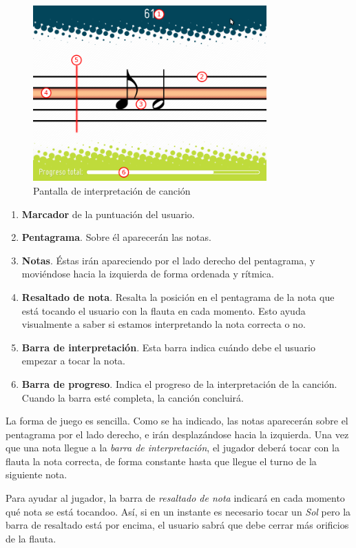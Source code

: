 \begin{figure}[h!]
  \centering
  \includegraphics[width=0.8\textwidth]{apendice_manual_usuario/imagen_seccionCanciones2}
  \caption{Pantalla de interpretación de canción}
\end{figure}

\begin{enumerate}
\item \textbf{Marcador} de la puntuación del usuario.
\item \textbf{Pentagrama}. Sobre él aparecerán las notas.
\item \textbf{Notas}. Éstas irán apareciendo por el lado derecho del pentagrama,
  y moviéndose hacia la izquierda de forma ordenada y rítmica.
\item \textbf{Resaltado de nota}. Resalta la posición en el pentagrama de la
  nota que está tocando el usuario con la flauta en cada momento. Esto ayuda
  visualmente a saber si estamos interpretando la nota correcta o no.
\item \textbf{Barra de interpretación}. Esta barra indica cuándo debe el usuario
  empezar a tocar la nota. 
\item \textbf{Barra de progreso}. Indica el progreso de la interpretación de la
  canción. Cuando la barra esté completa, la canción concluirá.
\end{enumerate}

La forma de juego es sencilla. Como se ha indicado, las notas aparecerán sobre
el pentagrama por el lado derecho, e irán desplazándose hacia la izquierda. Una
vez que una nota llegue a la \textit{barra de interpretación}, el jugador deberá
tocar con la flauta la nota correcta, de forma constante hasta que llegue el
turno de la siguiente nota.

Para ayudar al jugador, la barra de \textit{resaltado de nota} indicará en cada
momento qué nota se está tocandoo. Así, si en un instante es necesario tocar un
\textit{Sol} pero la barra de resaltado está por encima, el usuario sabrá que
debe cerrar más orificios de la flauta.

